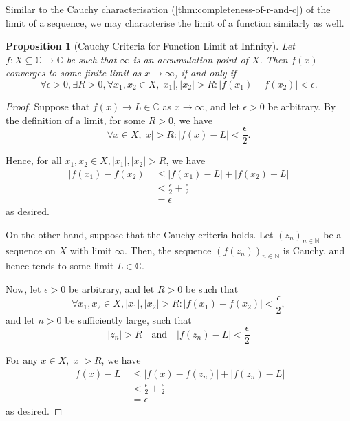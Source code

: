 \documentclass[11pt]{article}
\numberwithin{equation}{section}
\newtheorem{proposition}[theorem]{Proposition}
\theoremstyle{definition}
\theoremstyle{remark}
\newcommand{\pqty}[1]{\left(#1\right)}
\newcommand{\abs}[1]{\left|#1\right|}
\newcommand{\functiondomain}[3]{#1:#2\to #3}
\newcommand{\CC}{\mathbb C}
\newcommand{\NN}{\mathbb N}
\newcommand{\qand}{\quad\text{and}\quad}
\begin{document}
Similar to the Cauchy characterisation (\autoref{thm:completeness-of-r-and-c}) of the limit of a sequence, we may characterise the limit of a function similarly as well.

\begin{proposition}[Cauchy Criteria for Function Limit at Infinity]\label{analysis-unit-0183}
    \label{prop:cauchy-criteria-funciton-limit-infinity}%
    Let \(\functiondomain{f}{X \subseteq \CC}{\CC}\) be such that \(\infty\) is an accumulation point of \(X\). Then \(f\pqty{x}\) converges to some finite limit as \(x \to \infty\), if and only if
    \[
        \forall \epsilon > 0, \exists R > 0, \forall x_1, x_2 \in X, \abs{x_1}, \abs{x_2} > R: \abs{f\pqty{x_1} - f\pqty{x_2}} < \epsilon.
    \]
\end{proposition}

\begin{proof}
    Suppose that \(f\pqty{x} \to L \in \CC\) as \(x \to \infty\), and let \(\epsilon > 0\) be arbitrary. By the definition of a limit, for some \(R > 0\), we have
    \[
        \forall x \in X, \abs{x} > R: \abs{f\pqty{x} - L} < \frac{\epsilon}{2}.
    \]

    Hence, for all \(x_1, x_2 \in X, \abs{x_1}, \abs{x_2} > R\), we have
    \begin{align*}
        \abs{f\pqty{x_1} - f\pqty{x_2}} &\leq \abs{f\pqty{x_1} - L} + \abs{f\pqty{x_2} - L} \\
        &< \frac{\epsilon}{2} + \frac{\epsilon}{2} \\
        &= \epsilon
    \end{align*}
    as desired.

    On the other hand, suppose that the Cauchy criteria holds. Let \(\pqty{z_n}_{n \in \NN}\) be a sequence on \(X\) with limit \(\infty\). Then, the sequence \(\pqty{f\pqty{z_n}}_{n \in \NN}\) is Cauchy, and hence tends to some limit \(L \in \CC\).

    Now, let \(\epsilon > 0\) be arbitrary, and let \(R > 0\) be such that
    \[
        \forall x_1, x_2 \in X, \abs{x_1}, \abs{x_2} > R: \abs{f\pqty{x_1} - f\pqty{x_2}} < \frac{\epsilon}{2},
    \]
    and let \(n > 0\) be sufficiently large, such that
    \[
        \abs{z_n} > R \qand \abs{f\pqty{z_n} - L} < \frac{\epsilon}{2}
    \]  

    For any \(x \in X, \abs{x} > R\), we have
    \begin{align*}
        \abs{f\pqty{x} - L} &\leq \abs{f\pqty{x} - f\pqty{z_n}} + \abs{f\pqty{z_n} - L} \\
        &< \frac{\epsilon}{2} + \frac{\epsilon}{2} \\
        &= \epsilon
    \end{align*}
    as desired.
\end{proof}
\end{document}
